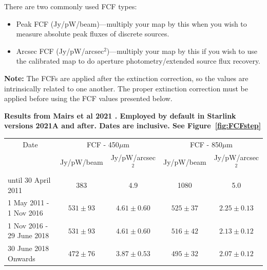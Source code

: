 \vspace{5mm}

There are two commonly used FCF types:
\begin{itemize}
\item Peak FCF (Jy/pW/beam)---multiply your map by this when you wish
to measure absolute peak fluxes of discrete sources.
\item Arcsec FCF (Jy/pW/arcsec$^2$)---multiply your map by this if
you wish to use the calibrated map to do aperture photometry/extended source flux recovery.
\end{itemize}

\textbf{Note:} The FCFs are applied after the extinction correction, so the values are intrinsically
related to one another. The proper extinction correction must be applied before using the FCF
values presented below.

\newpage

\textbf{Results from Mairs et al 2021 \cite{mairs21}. Employed by default in Starlink versions 2021A and after. Dates are inclusive. See Figure~\ref{fig:FCFstep}}\\
\begin{table}[h!]
\begin{center}
\begin{tabular}{|l|c|c|c|c|}
 \hline
 \multicolumn{1}{|c|}{Date} &
 \multicolumn{2}{c|}{FCF - 450$\mu$m} &
 \multicolumn{2}{c|}{FCF - 850$\mu$m} \\
\cline{2-5}
& Jy/pW/beam &Jy/pW/arcsec$^2$ & Jy/pW/beam &Jy/pW/arcsec$^2$ \\
 \hline
until 30 April 2011 &383  & 4.9 &1080 &5.0 \\
1 May 2011 - 1 Nov 2016 & $531\pm93$ & $4.61\pm0.60$ & $525\pm37$ & $2.25\pm0.13$ \\
1 Nov 2016 - 29 June 2018 & $531\pm93$ & $4.61\pm0.60$ & $516\pm42$ & $2.13\pm0.12$ \\
30 June 2018 Onwards & $472\pm76$ & $3.87\pm0.53$ & $495\pm32$ & $2.07\pm0.12$ 
 \\
\hline
\end{tabular}
\end{center}
\end{table}

